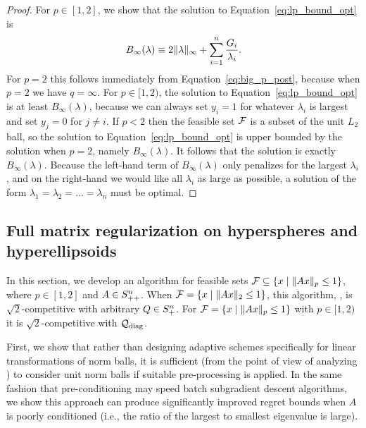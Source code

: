 \begin {proof}
For $p \in [1, 2]$, we show that the solution to Equation~\eqref{eq:lp_bound_opt} is
\begin{equation}\label{eq:l_one_two_post}
B_\infty(\lambda) \equiv 2\| \lambda \|_\infty + \sum_{i=1}^n \frac {G_i} {\lambda_i}.
\end{equation}
For $p = 2$ this follows immediately from
Equation~\eqref{eq:big_p_post}, because when $p = 2$ we have $q =
\infty$.  For $p \in [1, 2)$, the solution to
Equation~\eqref{eq:lp_bound_opt} is at least $B_\infty(\lambda)$,
because we can always set $y_i = 1$ for whatever $\lambda_i$ is
largest and set $y_j = 0$ for $j \neq i$.  If $p < 2$ then the
feasible set $\mathcal{F}$ is a subset of the unit $L_2$ ball, so the solution
to Equation~\eqref {eq:lp_bound_opt} is upper bounded by the solution
when $p = 2$, namely $B_\infty(\lambda)$.  It follows that the
solution is exactly $B_\infty(\lambda)$.  Because the left-hand term
of $B_\infty(\lambda)$ only penalizes for the largest $\lambda_i$, and
on the right-hand we would like all $\lambda_i$ as large as possible,
a solution of the form $\lambda_1 =
\lambda_2 = \dots = \lambda_n$ must be optimal.
\end {proof}


\subsection {Full matrix regularization on hyperspheres and hyperellipsoids}


In this section, we develop an algorithm for feasible sets $\mathcal{F}
\subseteq \left\{x \mid \| Ax \|_p \leq 1\right\}$, where $p \in [1,2]$ and $A
\in S^n_{++}$.  When $\mathcal{F} = \left\{x \mid \| Ax \|_2 \leq 1\right\}$, this
algorithm, \FTPRLscale, is $\sqrt{2}$-competitive with arbitrary $Q
\in S^n_{+}$.  For $\mathcal{F} =
\left\{x
\mid \| Ax \|_p \leq 1\right\}$ with $p \in [1,2)$ it is
$\sqrt{2}$-competitive with $\mathcal{Q}_{\text{diag}}$.

First, we show that rather than designing adaptive schemes
specifically for linear transformations of norm balls, it is
sufficient (from the point of view of analyzing
\FTPRL) to consider unit norm balls if suitable pre-processing is
applied.  In the same fashion that pre-conditioning may speed batch
subgradient descent algorithms, we show this approach can produce
significantly improved regret bounds when $A$ is poorly conditioned
(i.e., the ratio of the largest to smallest eigenvalue is large).

\newcommand{\Sh}{A}
\newcommand{\Snh}{A^{-1}}


